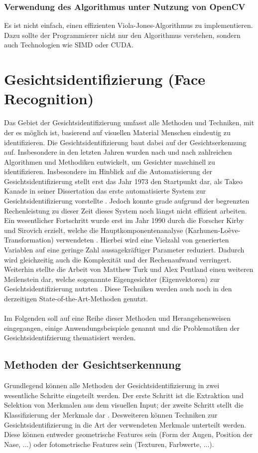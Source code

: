 \documentclass[doktyp=semarbeit, sprache=german]{TUBAFarbeiten}
\begin{document}
\subsubsection{Verwendung des Algorithmus unter Nutzung von OpenCV}
Es ist nicht einfach, einen effizienten Viola-Jones-Algorithmus zu implementieren. Dazu sollte der Programmierer nicht nur den Algorithmus verstehen, sondern auch Technologien wie SIMD oder CUDA. 

\newpage
\section{Gesichtsidentifizierung (Face Recognition)}
\label{identifizierung}
Das Gebiet der Gesichtsidentifizierung umfasst alle Methoden und Techniken, mit der es möglich ist, basierend auf visuellen Material Menschen eindeutig zu identifizieren. Die Gesichtsidentifizierung baut dabei auf der Gesichtserkennung auf. Insbesondere in den letzten Jahren wurden nach und nach zahlreichen Algorithmen und Methodiken entwickelt, um Gesichter maschinell zu identifizieren. Insbesondere im Hinblick auf die Automatisierung der Gesichtsidentifizierung stellt erst das Jahr 1973 den Startpunkt dar, als Takeo Kanade in seiner Dissertation das erste automatisierte System zur Gesichtsidentifizierung vorstellte \cite{Takeo}. Jedoch konnte grade aufgrund der begrenzten Rechenleistung zu dieser Zeit dieses System noch längst nicht effizient arbeiten. Ein wesentlicher Fortschritt wurde erst im Jahr 1990 durch die Forscher Kirby und Sirovich erzielt, welche die Hauptkomponentenanalyse (Karhunen-Loève-Transformation) verwendeten \cite{Kirby}. Hierbei wird eine Vielzahl von generierten Variablen auf eine geringe Zahl aussagekräftiger Parameter reduziert. Dadurch wird gleichzeitig auch die Komplexität und der Rechenaufwand verringert. Weiterhin stellte die Arbeit von Matthew Turk und Alex Pentland einen weiteren Meilenstein dar, welche sogenannte Eigengesichter (Eigenvektoren) zur Gesichtsidentifizierung nutzten \cite{Turk}. Diese Techniken werden auch noch in den derzeitigen State-of-the-Art-Methoden genutzt.
\\\\Im Folgenden soll auf eine Reihe dieser Methoden und Herangehensweisen eingegangen, einige Anwendungsbeispiele genannt und die Problematiken der Gesichtsidentifzierung thematisiert werden.
\subsection{Methoden der Gesichtserkennung}
Grundlegend können alle Methoden der Gesichtsidentifizierung in zwei wesentliche Schritte eingeteilt werden. Der erste Schritt ist die Extraktion und Selektion von Merkmalen aus dem visuellen Input; der zweite Schritt stellt die Klassifizierung der Merkmale dar \cite{FRS}. Desweiteren können Techniken zur Gesichtsidentifizierung in die Art der verwendeten Merkmale unterteilt werden. Diese können entweder geometrische Features sein (Form der Augen, Position der Nase, ...) oder fotometrische Features sein (Texturen, Farbwerte, ...).
\end{document}
